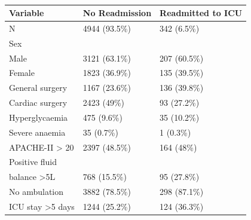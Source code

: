 \documentclass[onecolumn]{article}
\begin{document}
\begin{table}[hb]
\centering
	\renewcommand{\arraystretch}{1.4}
		\caption{}%
	\begin{tabular}{lp{2.5cm}p{2cm}}
		\hline
		Variable & No Readmission & Readmitted to ICU\\
		\hline
		N & 4944 (93.5\%)  &      342 (6.5\%)\\
		Sex &&\\
		\quad Male & 3121 (63.1\%)   &    207 (60.5\%)\\
		\quad Female & 1823 (36.9\%)  &     135 (39.5\%)\\
		General surgery & 1167 (23.6\%)   &    136 (39.8\%)\\
		Cardiac surgery & 2423 (49\%)     &   93 (27.2\%)\\
		Hyperglycaemia & 475 (9.6\%)    &    35 (10.2\%)\\
		Severe anaemia & 35 (0.7\%)      &    1 (0.3\%)\\
		APACHE-II > 20 &  2397 (48.5\%)  &       164 (48\%)\\
		Positive fluid&&\\
		balance >5L & 768 (15.5\%)  &      95 (27.8\%)\\
		No ambulation & 3882 (78.5\%)   &    298 (87.1\%)\\
		ICU stay >5 days & 1244 (25.2\%)   &    124 (36.3\%)\\
		\hline
	\end{tabular}
	\label{Table1Hammer}
\end{table}
\end{document}
